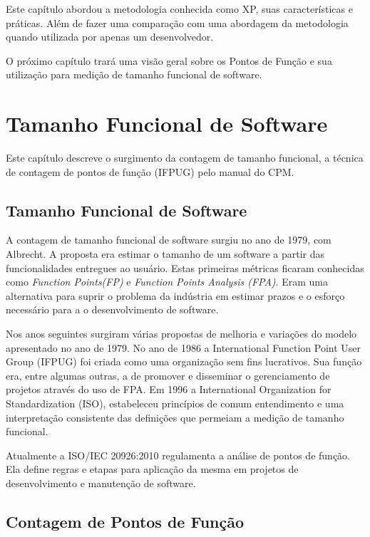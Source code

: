 \begin{table}[]
{\begin{tabular}{|c|l|}
\end{tabular}
}
\end{table}

Este capítulo abordou a metodologia conhecida como XP, suas características e práticas. Além de fazer uma comparação com uma abordagem da metodologia quando utilizada por apenas um desenvolvedor.

O próximo capítulo trará uma visão geral sobre os Pontos de Função e sua utilização para medição de tamanho funcional de software.


\chapter[Tamanho Funcional de Software]{Tamanho Funcional de Software}

Este capítulo descreve o surgimento da contagem de tamanho funcional, a técnica de contagem de pontos de função (IFPUG) pelo manual do CPM.

\section{Tamanho Funcional de Software}

A contagem de tamanho funcional de software surgiu no ano de 1979, com Albrecht. A proposta era estimar o tamanho de um software a partir das funcionalidades entregues ao usuário. Estas primeiras métricas ficaram conhecidas como \textit{Function Points(FP)} e \textit{Function Points Analysis (FPA)}. Eram uma alternativa para suprir o problema da indústria em estimar prazos e o esforço necessário para a o desenvolvimento de software. \cite{Gencel:2008}

Nos anos seguintes surgiram várias propostas de melhoria e variações do modelo apresentado no ano de 1979. No ano de 1986 a International Function Point User Group (IFPUG) foi criada como uma organização sem fins lucrativos. Sua função era, entre algumas outras, a de promover e disseminar o gerenciamento de projetos através do uso de FPA. Em 1996 a International Organization for Standardization (ISO), estabeleceu princípios de comum entendimento e uma interpretação consistente das  definições que permeiam a medição de tamanho funcional. \cite{Gencel:2008}

Atualmente a ISO/IEC 20926:2010 regulamenta a análise de pontos de função. Ela define regras e etapas para aplicação da mesma em projetos de desenvolvimento e manutenção de software. \cite{Marcos:2015}

\section{Contagem de Pontos de Função}

